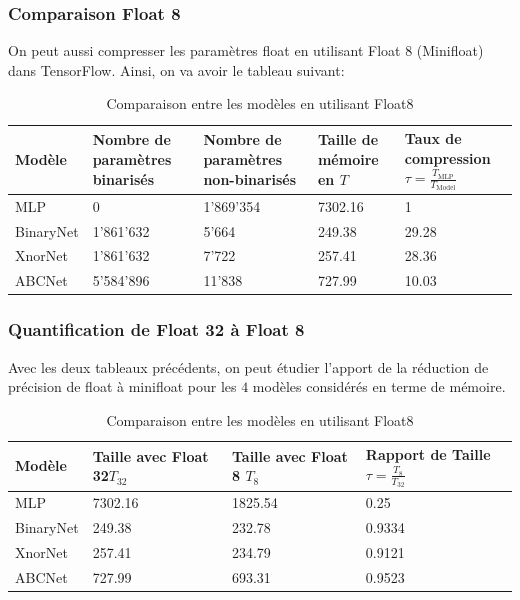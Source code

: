 \subsubsection{Comparaison Float 8}
On peut aussi compresser les paramètres float en utilisant Float 8 (Minifloat) dans TensorFlow.
\newline Ainsi, on va avoir le tableau suivant:
\begin{table}[h]
	\begin{tabularx}{\textwidth}{| X | X | X | X | X |}
		\hline
		
		Modèle & Nombre de paramètres binarisés &  Nombre de paramètres non-binarisés &  Taille de mémoire en \text{KB} \newline $T$ &  Taux de compression $\tau=\frac{T_{\text{MLP}}}{T_{\text{Model}}}$ \\
		\hline
		MLP & 0 & 1'869'354 & 7302.16 & 1 \\
		\hline 
		BinaryNet & 1'861'632 & 5'664 & 249.38 & 29.28 \\
		\hline
		XnorNet & 1'861'632 & 7'722 & 257.41 & 28.36 \\
		\hline
		ABCNet & 5'584'896 & 11'838 & 727.99 & 10.03 \\
		\hline
	\end{tabularx}
	\caption{Comparaison entre les modèles en utilisant Float8 }
\end{table}
\FloatBarrier

\subsubsection{Quantification de Float 32 à Float 8}
Avec les deux tableaux précédents, on peut étudier l'apport de la réduction de précision de float à minifloat pour les $4$ modèles considérés en terme de mémoire.
\begin{table}[h]
	\begin{tabularx}{\textwidth}{| X | X | X | X |}
		\hline
		
		Modèle & Taille avec Float 32\newline $T_{32}$ &  Taille avec Float 8  \newline $T_8$&  Rapport de Taille \newline $\tau=\frac{T_{\text{8}}}{T_{\text{32}}}$ \\
		\hline
		MLP & 7302.16 & 1825.54 & 0.25 \\
		\hline 
		BinaryNet & 249.38 & 232.78  & 0.9334 \\
		\hline
		XnorNet & 257.41 & 234.79 & 0.9121 \\
		\hline
		ABCNet & 727.99  & 693.31 & 0.9523\\
		\hline
	\end{tabularx}
	\caption{Comparaison entre les modèles en utilisant Float8 }
\end{table}
\FloatBarrier

